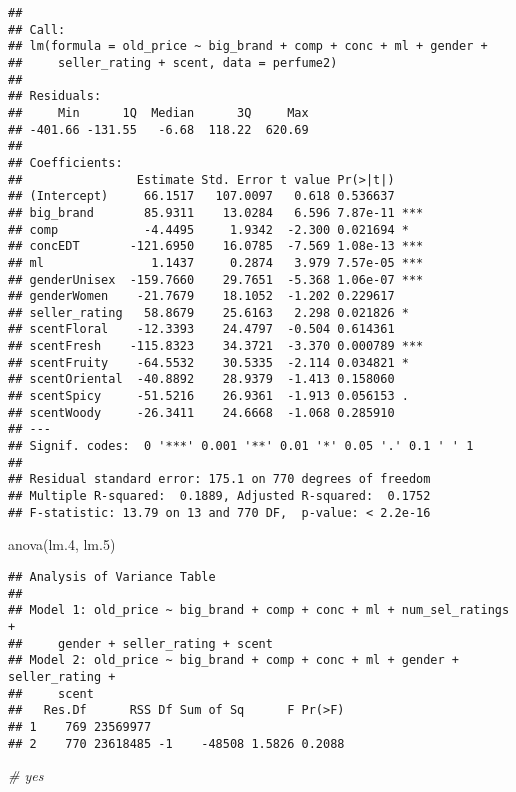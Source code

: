 \documentclass[
]{article}
\newenvironment{Shaded}{\begin{snugshade}}{\end{snugshade}}
\newcommand{\CommentTok}[1]{\textcolor[rgb]{0.56,0.35,0.01}{\textit{#1}}}
\newcommand{\FloatTok}[1]{\textcolor[rgb]{0.00,0.00,0.81}{#1}}
\newcommand{\FunctionTok}[1]{\textcolor[rgb]{0.00,0.00,0.00}{#1}}
\newcommand{\NormalTok}[1]{#1}
\begin{document}
\begin{verbatim}
## 
## Call:
## lm(formula = old_price ~ big_brand + comp + conc + ml + gender + 
##     seller_rating + scent, data = perfume2)
## 
## Residuals:
##     Min      1Q  Median      3Q     Max 
## -401.66 -131.55   -6.68  118.22  620.69 
## 
## Coefficients:
##                Estimate Std. Error t value Pr(>|t|)    
## (Intercept)     66.1517   107.0097   0.618 0.536637    
## big_brand       85.9311    13.0284   6.596 7.87e-11 ***
## comp            -4.4495     1.9342  -2.300 0.021694 *  
## concEDT       -121.6950    16.0785  -7.569 1.08e-13 ***
## ml               1.1437     0.2874   3.979 7.57e-05 ***
## genderUnisex  -159.7660    29.7651  -5.368 1.06e-07 ***
## genderWomen    -21.7679    18.1052  -1.202 0.229617    
## seller_rating   58.8679    25.6163   2.298 0.021826 *  
## scentFloral    -12.3393    24.4797  -0.504 0.614361    
## scentFresh    -115.8323    34.3721  -3.370 0.000789 ***
## scentFruity    -64.5532    30.5335  -2.114 0.034821 *  
## scentOriental  -40.8892    28.9379  -1.413 0.158060    
## scentSpicy     -51.5216    26.9361  -1.913 0.056153 .  
## scentWoody     -26.3411    24.6668  -1.068 0.285910    
## ---
## Signif. codes:  0 '***' 0.001 '**' 0.01 '*' 0.05 '.' 0.1 ' ' 1
## 
## Residual standard error: 175.1 on 770 degrees of freedom
## Multiple R-squared:  0.1889, Adjusted R-squared:  0.1752 
## F-statistic: 13.79 on 13 and 770 DF,  p-value: < 2.2e-16
\end{verbatim}

\begin{Shaded}
\begin{Highlighting}[]
\FunctionTok{anova}\NormalTok{(lm}\FloatTok{.4}\NormalTok{, lm}\FloatTok{.5}\NormalTok{)}
\end{Highlighting}
\end{Shaded}

\begin{verbatim}
## Analysis of Variance Table
## 
## Model 1: old_price ~ big_brand + comp + conc + ml + num_sel_ratings + 
##     gender + seller_rating + scent
## Model 2: old_price ~ big_brand + comp + conc + ml + gender + seller_rating + 
##     scent
##   Res.Df      RSS Df Sum of Sq      F Pr(>F)
## 1    769 23569977                           
## 2    770 23618485 -1    -48508 1.5826 0.2088
\end{verbatim}

\begin{Shaded}
\begin{Highlighting}[]
\CommentTok{\# yes}
\end{Highlighting}
\end{Shaded}
\end{document}
